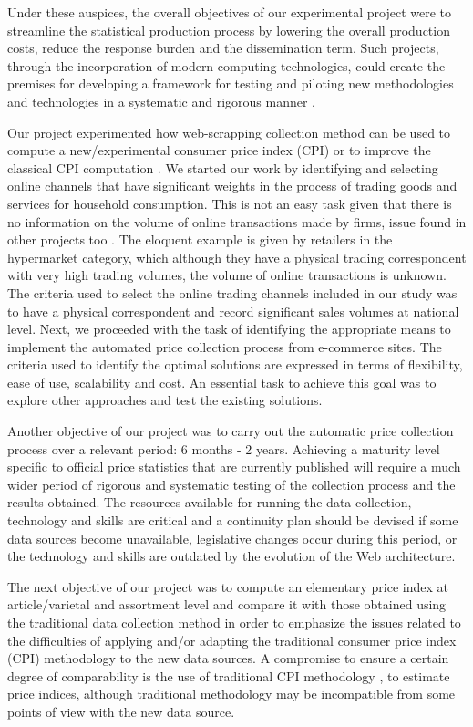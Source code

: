 \documentclass[]{article}
\begin{document}
Under these auspices, the overall objectives of our experimental project were to streamline the statistical production process by 
lowering the overall production costs, reduce the response burden and the dissemination term. Such projects, through the incorporation 
of modern computing technologies, could create the premises for developing a framework for testing and piloting new methodologies 
and technologies in a systematic and rigorous manner \cite{ons2017}. 


Our project experimented how web-scrapping collection method can be used to compute a new/experimental 
consumer price index (CPI) or to improve the classical CPI computation \cite{otawa2017}. We started our work by identifying and 
selecting online channels that have significant weights in the process of trading goods and services for household consumption. 
This is not an easy task given that there is no information on the volume of online transactions made by firms, 
issue found in other projects too \cite{willenborg2017}. The eloquent 
example is given by retailers in the hypermarket category, which although they have a physical trading correspondent with very high 
trading volumes, the volume of online transactions is unknown. The criteria used to select the online trading channels included in 
our study was to have a physical correspondent and record significant sales volumes at national level. Next, we proceeded with the 
task of identifying the appropriate means to implement the automated price collection process from e-commerce sites. The criteria 
used to identify the optimal solutions are expressed in terms of flexibility, ease of use, scalability and cost. An essential task 
to achieve this goal was to explore other approaches and test the existing solutions. 


Another objective of our project was to carry out the automatic price collection process over a relevant period: 6 months - 2 years. 
Achieving a maturity level specific to official price statistics that are currently published will require a much wider period of 
rigorous and systematic testing of the collection process and the results obtained. The resources available for running the data 
collection, technology and skills are critical and a continuity plan should be devised if some data sources become unavailable, 
legislative changes occur during this period, or the technology and skills are outdated by the evolution of the Web architecture. 


The next objective of our project was to compute an elementary price index at article/varietal and assortment level and compare 
it with those obtained using the traditional data collection method in order to emphasize the issues related to the difficulties 
of applying and/or adapting the traditional consumer price index (CPI) methodology \cite{cpi} to the new data sources.  A compromise to 
ensure a certain degree of comparability is the use of traditional CPI methodology \cite{cpi2}, \cite{cpi3} to estimate price indices, although 
traditional methodology may be incompatible from some points of view with the new data source. 
\end{document}
